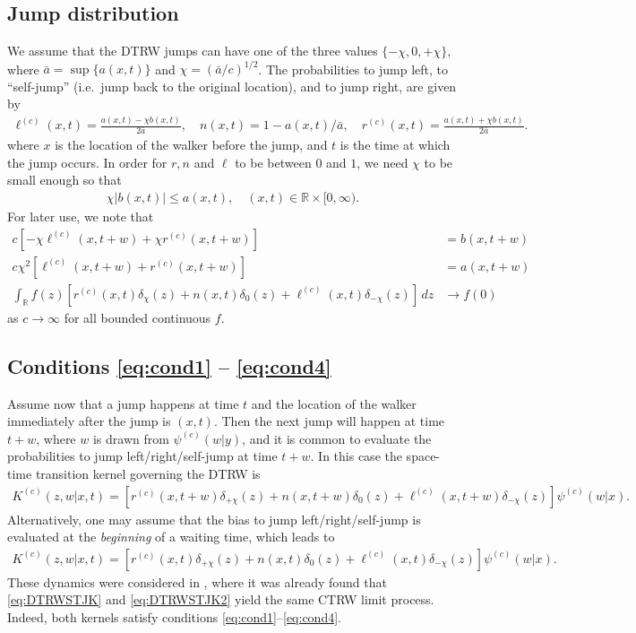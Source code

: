 \documentclass[a4paper,12pt]{elsarticle}
\numberwithin{equation}{section}
\theoremstyle{plain}
\theoremstyle{definition}
\theoremstyle{remark}
\numberwithin{equation}{section}
\newcommand{\spc}{\mathbb R}
\newcommand{\spctim}{\spc \times [0,\infty)}
\newcommand{\1}{\mathbf 1}
\begin{document}
\subsection{Jump distribution}

We assume that the DTRW jumps can have one of the three values
$\{-\chi, 0, +\chi\}$, where $\bar a = \sup\{a(x,t)\}$ and $\chi = (\bar a / c)^{1/2}$.
The probabilities to jump left, to ``self-jump'' (i.e.\ jump back to the 
original location), and to jump right, are given by
\begin{gather*}
\ell^{(c)}(x,t) = \frac{a(x,t) - \chi b(x,t)}{2 \bar a},
\quad 
n(x,t) = 1 - a(x,t)/\bar a,
\quad 
r^{(c)}(x,t) = \frac{a(x,t) + \chi b(x,t)}{2 \bar a}.
\end{gather*}
where $x$ is the location of the walker before the jump, and $t$ is the time at which the jump occurs.
In order for $r, n$ and $\ell$ to be between $0$ and $1$, 
we need $\chi$ to be small  enough so that 
\begin{align}
  \chi |b(x,t)|  \le a(x,t), \quad (x,t) \in \spctim. 
\end{align}
For later use, we note that
\begin{align}
\label{eq:jump-calc-b}
c [-\chi \ell^{(c)}(x,t+w) + \chi r^{(c)}(x,t+w)]
&= b(x,t+w)
\\ \label{eq:jump-calc-a}
c \chi^2 [\ell^{(c)}(x,t+w) + r^{(c)}(x,t+w)] &= a(x,t+w)
\\ \label{eq:jump2delta}
\int_\spc f(z)\left[r^{(c)}(x,t) \delta_\chi(z)
+ n(x,t) \delta_0(z) + \ell^{(c)}(x,t) \delta_{-\chi}(z) \right]\,dz
&\to f(0)
\end{align}
as $c \to \infty$ for all bounded continuous $f$.


\subsection{Conditions \eqref{eq:cond1} -- \eqref{eq:cond4}}

Assume now that a jump happens at time $t$ and the location of the walker immediately after the jump is $(x,t)$. 
Then the next jump will happen at time $t+w$, where $w$ is drawn from $\psi^{(c)}(w|y)$, and it is common to evaluate the probabilities to jump left/right/self-jump at time $t+w$.  In this case the space-time transition kernel governing the DTRW is 
\begin{align} \label{eq:DTRWSTJK}
  K^{(c)}(z,w|x,t) = \left[r^{(c)}(x,t+w)\delta_{+\chi}(z)
  + n(x, t+w) \delta_0(z)
  + \ell^{(c)}(x, t+w) \delta_{-\chi}(z)\right]
  \psi^{(c)}(w|x).
\end{align}
Alternatively, one may assume that the bias to jump left/right/self-jump is evaluated at the \emph{beginning} of a waiting time, which leads to 
\begin{align} \label{eq:DTRWSTJK2}
  K^{(c)}(z,w|x,t) = \left[r^{(c)}(x,t)\delta_{+\chi}(z)
  + n(x, t) \delta_0(z)
  + \ell^{(c)}(x, t) \delta_{-\chi}(z)\right]
  \psi^{(c)}(w|x).
\end{align}
These dynamics were considered in \cite{Angstmann2015}, where it was already found that \eqref{eq:DTRWSTJK} and \eqref{eq:DTRWSTJK2} yield the same CTRW limit process.  Indeed, both kernels satisfy conditions \eqref{eq:cond1}--\eqref{eq:cond4}.
\end{document}
